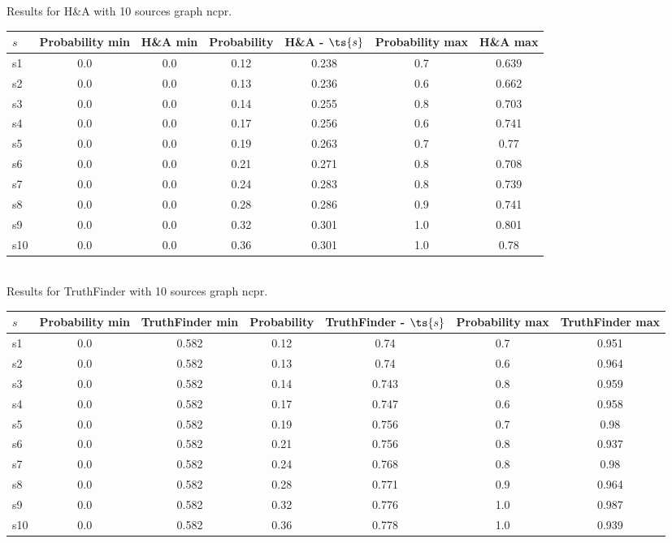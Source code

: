 \documentclass{article}
\begin{document}
\noindent Results for H\&A with 10 sources graph ncpr.

\noindent\begin{tabular}{|l|c|c|c|c|c|c|}
\hline
$s$& Probability min & H\&A min & Probability & H\&A - $\ts{s}$ & Probability max & H\&A max\\
\hline
s1 &0.0 & 0.0 & 0.12 & 0.238 & 0.7 & 0.639\\
\hline
s2 &0.0 & 0.0 & 0.13 & 0.236 & 0.6 & 0.662\\
\hline
s3 &0.0 & 0.0 & 0.14 & 0.255 & 0.8 & 0.703\\
\hline
s4 &0.0 & 0.0 & 0.17 & 0.256 & 0.6 & 0.741\\
\hline
s5 &0.0 & 0.0 & 0.19 & 0.263 & 0.7 & 0.77\\
\hline
s6 &0.0 & 0.0 & 0.21 & 0.271 & 0.8 & 0.708\\
\hline
s7 &0.0 & 0.0 & 0.24 & 0.283 & 0.8 & 0.739\\
\hline
s8 &0.0 & 0.0 & 0.28 & 0.286 & 0.9 & 0.741\\
\hline
s9 &0.0 & 0.0 & 0.32 & 0.301 & 1.0 & 0.801\\
\hline
s10 &0.0 & 0.0 & 0.36 & 0.301 & 1.0 & 0.78\\
\hline
\end{tabular}\\

\noindent Results for TruthFinder with 10 sources graph ncpr.

\noindent\begin{tabular}{|l|c|c|c|c|c|c|}
\hline
$s$& Probability min & TruthFinder min & Probability & TruthFinder - $\ts{s}$ & Probability max & TruthFinder max\\
\hline
s1 &0.0 & 0.582 & 0.12 & 0.74 & 0.7 & 0.951\\
\hline
s2 &0.0 & 0.582 & 0.13 & 0.74 & 0.6 & 0.964\\
\hline
s3 &0.0 & 0.582 & 0.14 & 0.743 & 0.8 & 0.959\\
\hline
s4 &0.0 & 0.582 & 0.17 & 0.747 & 0.6 & 0.958\\
\hline
s5 &0.0 & 0.582 & 0.19 & 0.756 & 0.7 & 0.98\\
\hline
s6 &0.0 & 0.582 & 0.21 & 0.756 & 0.8 & 0.937\\
\hline
s7 &0.0 & 0.582 & 0.24 & 0.768 & 0.8 & 0.98\\
\hline
s8 &0.0 & 0.582 & 0.28 & 0.771 & 0.9 & 0.964\\
\hline
s9 &0.0 & 0.582 & 0.32 & 0.776 & 1.0 & 0.987\\
\hline
s10 &0.0 & 0.582 & 0.36 & 0.778 & 1.0 & 0.939\\
\hline
\end{tabular}\\
\end{document}
